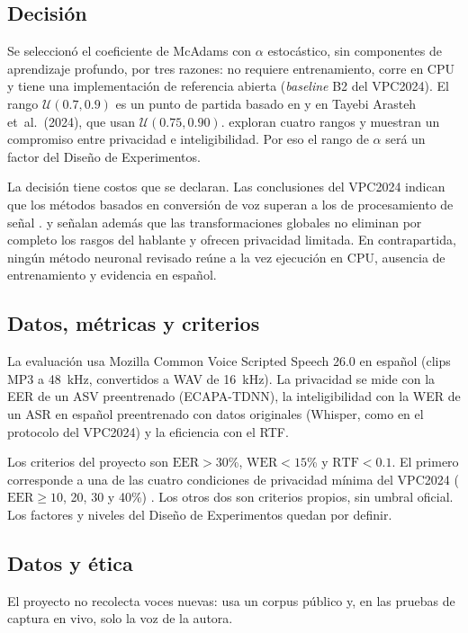 \subsection{Decisión}
Se seleccionó el coeficiente de McAdams con $\alpha$ estocástico, 
sin componentes de aprendizaje profundo, por tres razones: no requiere 
entrenamiento, corre en CPU y tiene una implementación de referencia abierta 
(\textit{baseline} B2 del VPC2024). El rango $\mathcal{U}(0.7,0.9)$ es un 
punto de partida basado en \textcite{patino2021} y en Tayebi Arasteh et~al.\ (2024), 
que usan $\mathcal{U}(0.75,0.90)$. exploran cuatro rangos y muestran un compromiso 
entre privacidad e inteligibilidad. Por eso el rango de $\alpha$ será un factor del 
Diseño de Experimentos.

La decisión tiene costos que se declaran. Las conclusiones del VPC2024 indican que los 
métodos basados en conversión de voz superan a los de procesamiento de señal 
\parencite{tomashenko2024}. \textcite{quamer2024} y \textcite{kuzmin2026} señalan además 
que las transformaciones globales no eliminan por completo los rasgos del hablante 
y ofrecen privacidad limitada. En contrapartida, ningún método neuronal revisado 
reúne a la vez ejecución en CPU, ausencia de entrenamiento y evidencia en español.

\subsection{Datos, métricas y criterios}
La evaluación usa Mozilla Common Voice Scripted Speech 26.0 en español 
(clips MP3 a 48~kHz, convertidos a WAV de 16~kHz). 
La privacidad se mide con la EER de un ASV preentrenado (ECAPA-TDNN), la 
inteligibilidad con la WER de un ASR en español preentrenado con datos originales 
(Whisper, como en el protocolo del VPC2024) y la eficiencia con el RTF.

Los criterios del proyecto son $\mathrm{EER} > 30$\%, $\mathrm{WER} < 15$\% y $\mathrm{RTF} < 0.1$. 
El primero corresponde a una de las cuatro condiciones de privacidad mínima del VPC2024 
($\mathrm{EER} \geq 10$, 20, 30 y 40\%) \parencite{tomashenko2024}. 
Los otros dos son criterios propios, sin umbral oficial. Los factores y niveles del Diseño de 
Experimentos quedan por definir.

\subsection{Datos y ética}
El proyecto no recolecta voces nuevas: usa un corpus público y, en las pruebas de captura en vivo, 
solo la voz de la autora.


